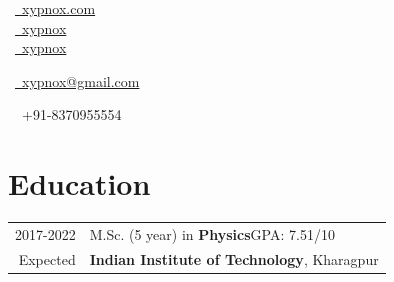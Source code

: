\documentclass[a4paper,12pt]{extarticle} %
\let\oldtextbf\textbf
\renewcommand{\textbf}[1]{\textcolor{bold}{\oldtextbf{#1}}}
\begin{document}
\pagestyle{empty} %


\begin{multicols}{3}
  \normalsize  \faGlobe\ {\href{http://xypnox.com/}{\  xypnox.com}}\\
  \normalsize \faGithub\ {\href{https://github.com/xypnox}{\  xypnox}}\\
  \normalsize  \faTwitter\ {\href{https://twitter.com/xypnox}{\  xypnox}}\\
  \columnbreak
  \normalsize\par{
    \centering{\large\textsc{\textcolor{primary}{xypnox}}}

  } %

  \columnbreak
  \raggedright\hfill\normalsize \faEnvelope\ {\href{mailto:xypnox@gmail.com}{\  xypnox@gmail.com}}\\
  \raggedright\hfill{\faPhone\ \  +91-8370955554}
\end{multicols}

\vspace{-0.5cm}



\section{\textcolor{primary}{Education}}

\begin{tabular}{r|p{15.7cm}}
  \textsc{2017-2022} & M.Sc. (5 year) in \textbf{Physics}\hfill\textsc{GPA}: 7.51/10 \\
  Expected           & \textbf{Indian Institute of Technology}, Kharagpur            \\
\end{tabular}
\end{document}
